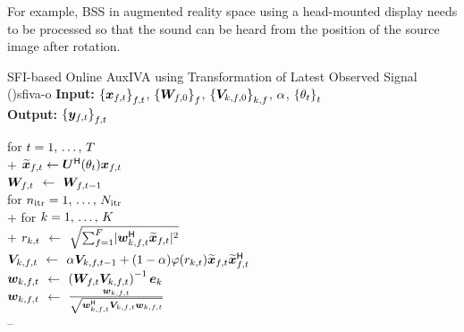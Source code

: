 \documentclass[sip,biber]{now-journal}
\begin{document}
For example, BSS in augmented reality space using a head-mounted display needs to be processed so that the sound can be heard from the position of the source image after rotation.
\begin{algorithm}{SFI-based Online AuxIVA using Transformation of Latest Observed Signal (\SFIIVAo)}{sfiva-o}
  \textbf{Input:} ${\{\Obs _{\ft}\}} _{\ft}$, ${\{\bm{W} _{f,0}\}} _{f}$, ${\{\bm{V} _{k,f,0}\}} _{k,f}$, $\alpha$, ${\{\theta _{t}\}} _{t}$ \\
  \textbf{Output:} ${\{\Est _{\ft}\}} _{\ft}$
  \begin{pseudo}
    for $t = 1,\, \dots,\, T$ \\+
    $\refpos{\Obs} _{\ft} \gets \rotMat ^{\hermite} (\rotSpat _{\tframe}) \Obs _{\ft}$ \ct{$\forall \freq$} \\
      {$\Demix _{\ft}$} $\gets$ $\Demix _{\ft[-1]}$ \ct{$\forall \freq$} \\
      for $n _{\mathrm{itr}} = 1,\, \dots,\, N _{\mathrm{itr}}$ \\+
        for $k = 1,\, \dots,\, K$ \\+
          {$r _{k,t}$} $\gets$ $\sqrt{\sum _{\freq = 1} ^{\Freq} \abs{\demix _{\src,\ft} ^{\hermite} \refpos{\Obs} _{\ft}} ^2}$ \ct{\eqref{eq:var}} \\
          {$\cov _{\src,\ft}    $} $\gets$ $\forget \cov _{\src,\ft[-1]} + (1 - \forget) \weight(\var _{\src,\tframe}) \refpos{\Obs} _{\ft} \refpos{\Obs} _{\ft} ^{\hermite}$ \ct{\eqref{eq:cov}, $\forall \freq$} \\
          {$\demix _{\src,\ft}$} $\gets$ $\left(\Demix _{\ft} \cov _{\src,\ft}\right) ^{-1} \eye _{\src}$ \ct{\eqref{eq:ip:proj}, $\forall \freq$} \\
          {$\demix _{\src,\ft}$} $\gets$ $\frac{\demix _{\src,\ft}}{\sqrt{\demix _{\src,\ft} ^{\hermite} \cov _{\src,\ft} \demix _{\src,\ft}}}$ \ct{\eqref{eq:ip:norm}, $\forall \freq$} \\--


\end{pseudo}
\end{algorithm}
\end{document}
